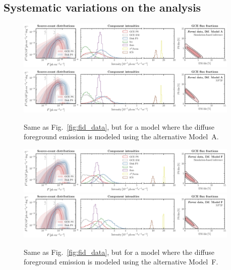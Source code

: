 \documentclass[prd,aps,10pt,nofootinbib,twocolumn,superscriptaddress,preprintnumbers,balancelastpage,longbibliography,floatfix]{revtex4-2}
\begin{document}
\subsection{Systematic variations on the analysis}
\label{sec:systematics}

%
\begin{figure}
\centering
\includegraphics[width=0.95\textwidth]{plots/data_fid_sbi_modelA.pdf}
\includegraphics[width=0.95\textwidth]{plots/data_fid_nptf_modelA.pdf}
\caption{Same as Fig.~\ref{fig:fid_data}, but for a model where the diffuse foreground emission is modeled using the alternative {Model~A}.}
\label{fig:fid_data_modelA}
\end{figure}
%

%
\begin{figure}
\centering
\includegraphics[width=0.95\textwidth]{plots/data_fid_sbi_modelF.pdf}
\includegraphics[width=0.95\textwidth]{plots/data_fid_nptf_modelF.pdf}
\caption{Same as Fig.~\ref{fig:fid_data}, but for a model where the diffuse foreground emission is modeled using the alternative {Model~F}.}
\label{fig:fid_data_modelF}
\end{figure}
%
\end{document}
